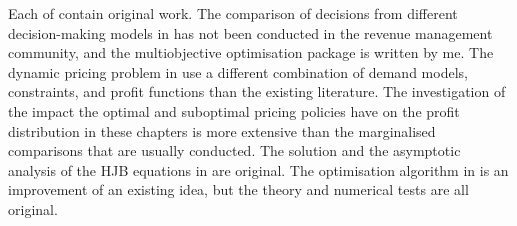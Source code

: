 \documentclass[main.tex]{subfiles}
\begin{document}
Each of
contain original work.  The comparison of decisions from different
decision-making models in  has not been conducted in
the revenue management community, and the multiobjective optimisation
package is written by me.  The dynamic pricing problem in
 use a different combination
of demand models, constraints, and profit functions than the existing
literature.  The investigation of the impact the optimal and
suboptimal pricing policies have on the profit distribution in these
chapters is more extensive than the marginalised comparisons that are
usually conducted. The solution and the asymptotic analysis of the HJB
equations in  are original.  The optimisation
algorithm in  is an improvement of an existing idea,
but the theory and numerical tests are all original.

\end{document}

